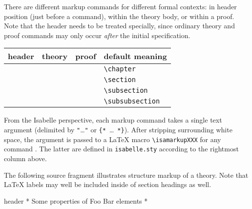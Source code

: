 \begin{isabellebody}
\begin{isamarkuptext}
  There are different markup commands for different formal contexts:
  in header position (just before a  command),
  within the theory body, or within a proof.  Note that the header
  needs to be treated specially, since ordinary theory and proof
  commands may only occur \emph{after} the initial 
  specification.

  \smallskip

  \begin{tabular}{llll}
  header & theory & proof & default meaning \\\hline
    & \commdx{chapter} & & \verb,\chapter, \\
  \commdx{header} & \commdx{section} & \commdx{sect} & \verb,\section, \\
    & \commdx{subsection} & \commdx{subsect} & \verb,\subsection, \\
    & \commdx{subsubsection} & \commdx{subsubsect} & \verb,\subsubsection, \\
  \end{tabular}

  \medskip

  From the Isabelle perspective, each markup command takes a single
  text argument (delimited by \verb,",\dots\verb,", or
  \verb,{,\verb,*,~\dots~\verb,*,\verb,},).  After stripping
  surrounding white space, the argument is passed to a {\LaTeX} macro
  \verb,\isamarkupXXX, for any command .  The latter
  are defined in \verb,isabelle.sty, according to the rightmost column
  above.

  \medskip The following source fragment illustrates structure markup
  of a theory.  Note that {\LaTeX} labels may well be included inside
  of section headings as well.

  \begin{ttbox}
  header {\ttlbrace}* Some properties of Foo Bar elements *{\ttrbrace}


\end{ttbox}
\end{isamarkuptext}
\end{isabellebody}
